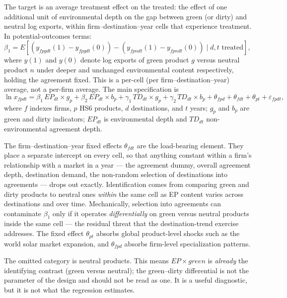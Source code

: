 \documentclass[12pt]{article}
\begin{document}
The target is an average treatment effect on the treated: the effect of one additional
unit of environmental depth on the gap between green (or dirty) and neutral log exports,
within firm--destination--year cells that experience treatment. In potential-outcomes
terms: $\beta_1 = E[(y_{fpgdt}(1)-y_{fpgdt}(0)) - (y_{fpndt}(1)-y_{fpndt}(0)) \mid d,t
\text{ treated}]$, where $y(1)$ and $y(0)$ denote log exports of green product $g$ versus
neutral product $n$ under deeper and unchanged environmental content respectively, holding
the agreement fixed. This is a per-cell (per firm--destination--year) average, not a
per-firm average. The main specification is
\begin{equation}\label{eq:main}
\ln x_{fpdt} = \beta_1\, EP_{dt}\!\times\!g_p + \beta_2\, EP_{dt}\!\times\!b_p
+ \gamma_1\, TD_{dt}\!\times\!g_p + \gamma_2\, TD_{dt}\!\times\!b_p
+ \theta_{fpd} + \theta_{fdt} + \theta_{pt} + \varepsilon_{fpdt},
\end{equation}
where $f$ indexes firms, $p$ HS6 products, $d$ destinations, and $t$ years; $g_p$ and
$b_p$ are green and dirty indicators; $EP_{dt}$ is environmental depth and $TD_{dt}$
non-environmental agreement depth.

The firm--destination--year fixed effects $\theta_{fdt}$ are the load-bearing element.
They place a separate intercept on every cell, so that anything constant within a firm's
relationship with a market in a year --- the agreement dummy, overall agreement depth,
destination demand, the non-random selection of destinations into agreements --- drops
out exactly. Identification comes from comparing green and dirty products to neutral ones
\emph{within} the same cell as EP content varies across destinations and over time.
Mechanically, selection into agreements can contaminate $\beta_1$ only if it operates
\emph{differentially} on green versus neutral products inside the same cell --- the
residual threat that the destination-trend exercise addresses. The fixed effect $\theta_{pt}$
absorbs global product-level shocks such as the world solar market expansion, and
$\theta_{fpd}$ absorbs firm-level specialization patterns.

The omitted category is neutral products. This means $EP \times \mathit{green}$ is
\emph{already} the identifying contrast (green versus neutral); the green--dirty
differential is not the parameter of the design and should not be read as one. It is a
useful diagnostic, but it is not what the regression estimates.
\end{document}
